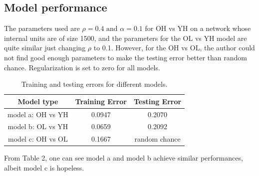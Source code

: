 \documentclass[a4paper,11pt,oneside]{article}
\begin{document}
\subsection{Model performance}

The parameters used are $\rho = 0.4 \text{ and } \alpha = 0.1 $ for OH vs YH on a network whose internal units are of size 1500, and the parameters for the OL vs YH model are quite similar just changing $\rho$ to 0.1. However, for the OH vs OL, the author could not find good enough parameters to make the testing error better than random chance. Regularization is set to zero for all models. 
\begin{table}[h!]
	\centering
	\begin{tabular}{||c c c||} 
		\hline
		Model type & Training Error & Testing Error \\ [0.5ex] 
		\hline\hline
		model a: OH vs YH & 0.0947 & 0.2070 \\ 
		model b: OL vs YH & 0.0659 & 0.2092  \\
		model c: OH vs OL & 0.1667 & random chance  \\ [0.5ex] 
		\hline
	\end{tabular}
\caption{Training and testing errors for different models.}
\end{table}

From Table 2, one can see model a and model b achieve similar performances, albeit model c is hopeless. 
\end{document}
